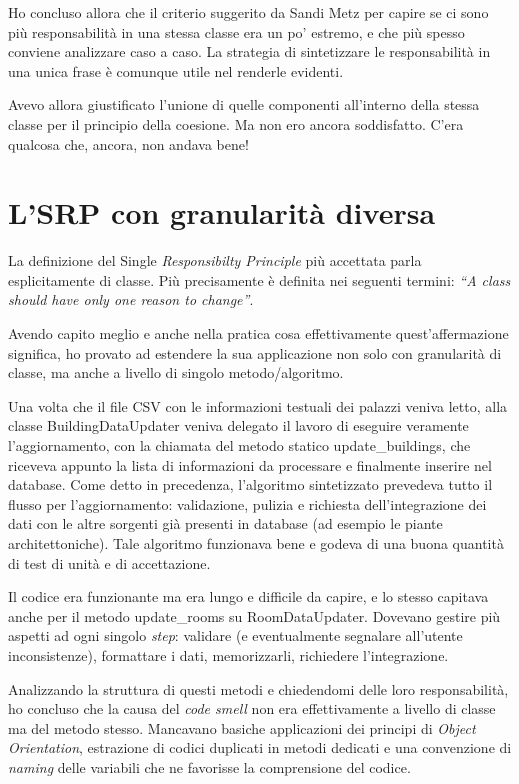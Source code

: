 \documentclass[12pt]{report}
\begin{document}
Ho concluso allora che il criterio suggerito da Sandi Metz 
per capire se ci sono più responsabilità in una stessa classe era
un po' estremo, e che più spesso conviene analizzare caso a caso. La
strategia di sintetizzare le responsabilità in una unica frase
è comunque utile nel renderle evidenti.

Avevo allora giustificato l'unione di quelle componenti all'interno della
stessa classe per il principio della coesione.
Ma non ero ancora soddisfatto. C'era qualcosa che, ancora, non andava bene!

\section{L'SRP con granularità diversa}

La definizione del Single \textit{Responsibilty Principle} più accettata
parla esplicitamente di classe. Più precisamente è definita nei seguenti 
termini:
\textit{``A class should have only one reason to change''\cite{bobmartin2003}}.

Avendo capito meglio e anche nella pratica cosa effettivamente 
quest'affermazione significa, ho provato ad estendere la sua applicazione
non solo con granularità di classe, ma anche a livello di singolo 
metodo/algoritmo.

Una volta che il file CSV con le informazioni testuali dei palazzi
veniva letto, alla classe BuildingDataUpdater 
veniva delegato il lavoro di eseguire veramente l'aggiornamento, con 
la chiamata del metodo statico update\_buildings, che riceveva appunto la 
lista di informazioni da processare e finalmente inserire nel database. 
Come detto in precedenza, l'algoritmo sintetizzato prevedeva tutto il 
flusso per l'aggiornamento: validazione, pulizia e richiesta dell'integrazione
dei dati con le altre sorgenti già presenti in database (ad esempio le piante 
architettoniche). Tale algoritmo funzionava bene e godeva di una buona quantità
di test di unità e di accettazione. 

Il codice era funzionante ma era lungo e difficile da capire, e lo stesso
capitava anche per il metodo update\_rooms su RoomDataUpdater.
Dovevano gestire più aspetti ad ogni singolo \textit{step}:
validare (e eventualmente segnalare all'utente inconsistenze), formattare i
dati, memorizzarli, richiedere l'integrazione.

Analizzando la struttura di questi metodi e chiedendomi delle loro
responsabilità, ho concluso che la causa del \textit{code smell} non
era effettivamente a livello di classe ma del metodo stesso. 
Mancavano basiche applicazioni dei principi di \textit{Object Orientation},
estrazione di codici duplicati in metodi dedicati e una convenzione
di \textit{naming} delle variabili che ne favorisse la comprensione
del codice.
\end{document}
